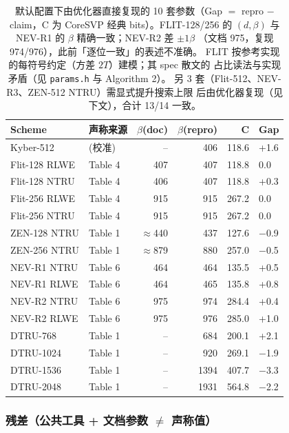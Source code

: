 \documentclass[11pt,a4paper]{ctexart}
\begin{document}
\begin{table}[htbp]\centering\small
\begin{tabular}{@{}llrrrl@{}}
\toprule
Scheme & 声称来源 & $\beta$(doc) & $\beta$(repro) & C & Gap \\
\midrule
Kyber-512 & (校准) & -- & 406 & 118.6 & +1.6 \\
\midrule
Flit-128 RLWE & Table 4 & 407 & 407 & 118.8 & 0.0 \\
Flit-128 NTRU & Table 4 & 406 & 407 & 118.8 & +0.3 \\
Flit-256 RLWE & Table 4 & 915 & 915 & 267.2 & 0.0 \\
Flit-256 NTRU & Table 4 & 915 & 915 & 267.2 & 0.0 \\
\midrule
ZEN-128 NTRU & Table 1 & $\approx$440 & 437 & 127.6 & $-$0.9 \\
ZEN-256 NTRU & Table 1 & $\approx$879 & 880 & 257.0 & $-$0.5 \\
\midrule
NEV-R1 NTRU & Table 6 & 464 & 464 & 135.5 & +0.5 \\
NEV-R1 RLWE & Table 6 & 464 & 465 & 135.8 & +0.8 \\
NEV-R2 NTRU & Table 6 & 975 & 974 & 284.4 & +0.4 \\
NEV-R2 RLWE & Table 6 & 975 & 976 & 285.0 & +1.0 \\
\midrule
DTRU-768 & Table 1 & -- & 684 & 200.1 & +2.1 \\
DTRU-1024 & Table 1 & -- & 920 & 269.1 & $-$1.9 \\
DTRU-1536 & Table 1 & -- & 1394 & 407.7 & $-$3.3 \\
DTRU-2048 & Table 1 & -- & 1931 & 564.8 & $-$2.2 \\
\bottomrule
\end{tabular}
\caption{默认配置下由优化器直接复现的 10 套参数（Gap $=$ repro
$-$ claim，C 为 CoreSVP 经典 bits）。FLIT-128/256 的 $(d,\beta)$
与 NEV-R1 的 $\beta$ 精确一致；NEV-R2 差 $\pm 1\beta$
（文档 975，复现 974/976），此前「逐位一致」的表述不准确。
FLIT 按参考实现的每符号约定（方差 $2T$）建模；其 spec 散文的
占比读法与实现矛盾（见 \texttt{params.h} 与 Algorithm 2）。
另 3 套（Flit-512、NEV-R3、ZEN-512 NTRU）需显式提升搜索上限
后由优化器复现（见下文），合计 13/14 一致。}
\end{table}

\subsubsection{残差（公共工具 + 文档参数 $\neq$ 声称值）}
\end{document}
